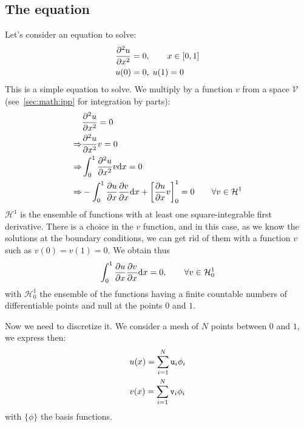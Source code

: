 \subsection{The equation}

Let's consider an equation to solve:
\begin{equation}
\begin{split}
& \frac{\partial^2u}{\partial{x}^2} = 0,\qquad x \in [0,1] \\
& u(0) = 0, \; u(1) = 0
\end{split}
\label{sec:math:eq}
\end{equation}
This is a simple equation to solve.
We multiply by a function $v$ from a space $\mathcal{V}$
(see~\ref{sec:math:ipp} for integration by parts):
\begin{equation}
\begin{split}
            & \frac{\partial^2u}{\partial{x}^2} = 0 \\
\Rightarrow & \frac{\partial^2u}{\partial{x}^2} v = 0 \\
\Rightarrow & \int_0^1\frac{\partial^2u}{\partial{x}^2} v \mathrm{d} x = 0 \\
\Rightarrow & -\int_0^1\frac{\partial u}{\partial x}\frac{\partial v}{\partial x} \mathrm{d} x + \left[\frac{\partial u}{\partial x}v\right]_0^1 = 0 \qquad \forall v \in \mathcal{H}^1\\
\end{split}
\end{equation}
$\mathcal{H}^1$ is the ensemble of functions with at least one square-integrable
first derivative.
There is a choice in the $v$ function, and in this case, as we know the solutions
at the boundary conditions, we can get rid of them with a function $v$ such as
$v(0) = v(1) = 0$. We obtain thus
\begin{equation}
\int_0^1\frac{\partial u}{\partial x}\frac{\partial v}{\partial x} \mathrm{d} x = 0, \qquad \forall v \in \mathcal{H}_0^1
\label{sec:math:weak_form}
\end{equation}
with $\mathcal{H}_0^1$ the ensemble of the functions having a finite countable numbers
of differentiable points and null at the points $0$ and $1$.

Now we need to discretize it. We consider a mesh of $N$ points between $0$ and $1$, we
express then:
\begin{equation}
\begin{split}
& u(x) = \sum_{i=1}^{N} \mathtt{u}_i \phi_i \\
& v(x) = \sum_{i=1}^{N} \mathtt{v}_i \phi_i
\end{split}
\label{sec:math:discretization}
\end{equation}
with $\{\phi\}$ the basis functions.

